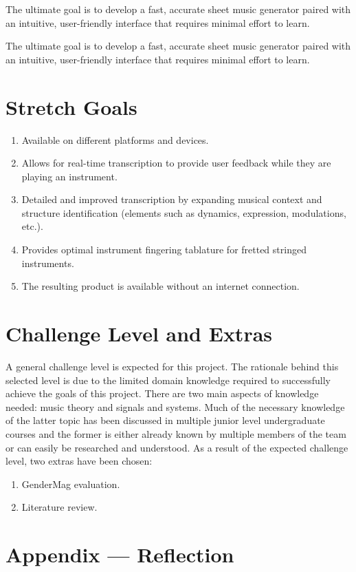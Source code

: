 \documentclass{article}
\begin{document}
The ultimate goal is to develop a fast, accurate sheet music generator paired with an intuitive, user-friendly interface that requires minimal effort to learn.

The ultimate goal is to develop a fast, accurate sheet music generator paired with an intuitive, user-friendly interface that requires minimal effort to learn.

\section{Stretch Goals}
\begin{enumerate}
    \item Available on different platforms and devices.
    \item Allows for real-time transcription to provide user feedback while they are playing an
    instrument.
    \item Detailed and improved transcription by expanding musical context and
    structure identification (elements such as dynamics, expression, modulations, etc.).
    \item Provides optimal instrument fingering tablature for fretted stringed instruments.
    \item The resulting product is available without an internet connection.
\end{enumerate}

\section{Challenge Level and Extras}
A general challenge level is expected for this project. The rationale behind this selected level is due to
the limited domain knowledge required to successfully achieve the goals of this project. There are two main 
aspects of knowledge needed: music theory and signals and systems. Much of the necessary knowledge of the 
latter topic has been discussed in multiple junior level undergraduate courses and the former is either already
known by multiple members of the team or can easily be researched and understood.
As a result of the expected challenge level, two extras have been chosen:
\begin{enumerate}
    \item GenderMag evaluation.
    \item Literature review.
\end{enumerate}

\newpage{}

\section*{Appendix --- Reflection}
\end{document}
